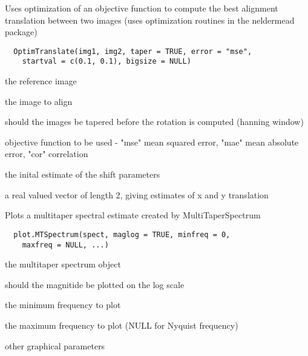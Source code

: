 \documentclass[a4paper]{book}
\begin{document}
%
\begin{Description}\relax
Uses optimization of an objective function to compute the
best alignment translation between two images (uses
optimization routines in the neldermead package)
\end{Description}
%
\begin{Usage}
\begin{verbatim}
  OptimTranslate(img1, img2, taper = TRUE, error = "mse",
    startval = c(0.1, 0.1), bigsize = NULL)
\end{verbatim}
\end{Usage}
%
\begin{Arguments}
\begin{ldescription}
\item[\code{img1}] the reference image

\item[\code{img2}] the image to align

\item[\code{taper}] should the images be tapered before the
rotation is computed (hanning window)

\item[\code{error}] objective function to be used - "mse" mean
squared error, "mae" mean absolute error, "cor"
correlation

\item[\code{startval}] the inital estimate of the shift
parameters
\end{ldescription}
\end{Arguments}
%
\begin{Value}
a real valued vector of length 2, giving estimates of x
and y translation
\end{Value}
%
\begin{Description}\relax
Plots a multitaper spectral estimate created by
MultiTaperSpectrum
\end{Description}
%
\begin{Usage}
\begin{verbatim}
  plot.MTSpectrum(spect, maglog = TRUE, minfreq = 0,
    maxfreq = NULL, ...)
\end{verbatim}
\end{Usage}
%
\begin{Arguments}
\begin{ldescription}
\item[\code{spect}] the multitaper spectrum object

\item[\code{maglog}] should the magnitide be plotted on the log
scale

\item[\code{minfreq}] the minimum frequency to plot

\item[\code{maxfreq}] the maximum frequency to plot (NULL for
Nyquist frequency)

\item[\code{...}] other graphical parameters
\end{ldescription}
\end{Arguments}
\end{document}

